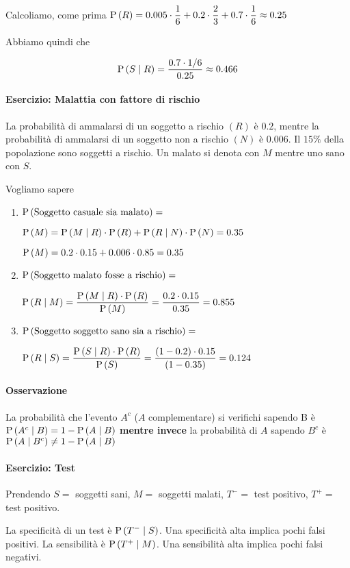 Calcoliamo, come prima $ \text{P}\left(R\right) = 0.005 \cdot \dfrac{1}{6} + 0.2 \cdot \dfrac{2}{3} + 0.7 \cdot \dfrac{1}{6} \approx 0.25 $

Abbiamo quindi che 

\[ \text{P}\left(S \mid R\right) = \dfrac{0.7 \cdot 1/6}{0.25} \approx 0.466 \]

\paragraph{Esercizio: Malattia con fattore di rischio}
La probabilità di ammalarsi di un soggetto a rischio $ (R) $ è $ 0.2 $, mentre la probabilità di ammalarsi di un soggetto non a rischio $ (N) $ è $ 0.006 $. Il $ 15\% $ della popolazione sono soggetti a rischio. Un malato si denota con $ M $ mentre uno sano con $ S $.

Vogliamo sapere 

\begin{enumerate}
	\item $ \text{P}\left(\text{Soggetto casuale sia malato}\right) = $
	
	$ \text{P}\left(M\right) = \text{P}\left(M \mid R\right) \cdot \text{P}\left(R\right) + \text{P}\left(R \mid N\right) \cdot \text{P}\left(N\right) = 0.35 $ 
	
	$ \text{P}\left(M\right) = 0.2 \cdot 0.15 + 0.006 \cdot 0.85 = 0.35 $
	
	\item $ \text{P}\left(\text{Soggetto malato fosse a rischio}\right) = $
	
	$ \text{P}\left(R \mid M\right) = \dfrac{\text{P}\left(M \mid R\right) \cdot \text{P}\left(R\right)}{\text{P}\left(M\right)} = \dfrac{0.2 \cdot 0.15}{0.35} = 0.855 $
	
	\item $ \text{P}\left(\text{Soggetto soggetto sano sia a rischio}\right) = $
	
	$ \text{P}\left(R \mid S\right) = \dfrac{\text{P}\left(S \mid R\right) \cdot \text{P}\left(R\right)}{\text{P}\left(S\right)} = \dfrac{(1-0.2) \cdot 0.15}{(1-0.35)} = 0.124$
\end{enumerate}

\paragraph{Osservazione}

La probabilità che l'evento $ A^c $ ($ A $ complementare) si verifichi sapendo B è $ \text{P}\left(A^c \mid B\right) = 1 - \text{P}\left(A \mid B\right) $ 
\textbf{mentre invece} la probabilità di $ A $ sapendo $ B^c $ è $ \text{P}\left(A \mid B^c\right) \neq 1 - \text{P}\left(A \mid B\right) $

\paragraph{Esercizio: Test}
Prendendo $ S = $ soggetti sani, $ M = $ soggetti malati, $ T^- = $ test positivo, $ T^+ = $ test positivo.

La specificità di un test è $ \text{P}\left(T^- \mid S\right) $. Una specificità alta implica pochi falsi positivi. La sensibilità è $ \text{P}\left(T^+ \mid M\right) $. Una sensibilità alta implica pochi falsi negativi.
